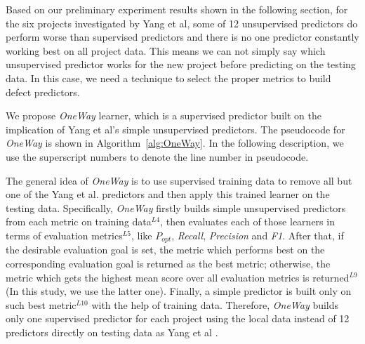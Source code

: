 \documentclass[sigconf]{acmart}
\theoremstyle{break}
\begin{document}
Based on our preliminary experiment results
shown in the following section, for the six projects
investigated by Yang et al, some of 12 unsupervised
predictors do perform worse than supervised predictors and there is 
no one predictor constantly working best on all project data.
This means we can not simply say which unsupervised predictor 
works for the new project before predicting on the testing data. In this case,
we need a technique to select the proper metrics to build defect predictors.


We propose {\it OneWay} learner, which is a supervised predictor built on
the implication of Yang et al's simple unsupervised predictors. 
The pseudocode for {\it OneWay}
is shown in Algorithm~\ref{alg:OneWay}. In the following description,
we use the superscript numbers to denote the line number in pseudocode. 

The general idea of {\it OneWay} is to use supervised training data to 
remove all but one of the Yang et al. predictors and then apply this trained
learner on the testing data. Specifically, {\it OneWay} firstly builds simple
unsupervised predictors from each metric on training data$^{L4}$, then
evaluates each of those learners in terms of evaluation metrics$^{L5}$,
like $P_{opt}$, {\it Recall}, {\it Precision} and {\it F1}. After that, if the desirable
evaluation goal is set, the metric which performs best on the corresponding
evaluation goal is returned as the best metric; otherwise, the metric
which gets the highest mean score over all evaluation metrics is returned$^{L9}$(In this study,
we use the latter one).
Finally, a simple predictor  is built only
on such best metric$^{L10}$ with the help of training data. Therefore, {\it OneWay} builds only one supervised predictor for each project using the local data instead of
12 predictors directly on testing data as Yang et al \cite{yang2016effort} .
\end{document}
